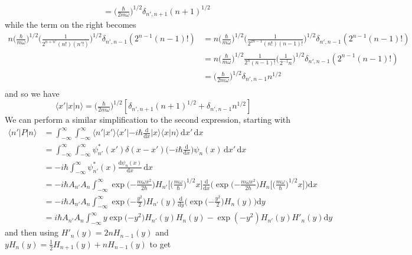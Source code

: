 \documentclass[../principles-of-quantum-mechanics.tex]{subfiles}
\begin{document}
\begin{questions}
\begin{solution}
\begin{align*}
				&= \big(\tfrac{\hbar}{2m\omega}\big)^{1/2}\delta_{n', n+1}(n+1)^{1/2}
			\end{align*}
			while the term on the right becomes
			\begin{align*}
				n\big(\tfrac{\hbar}{m\omega}\big)^{1/2}\big(\tfrac{1}{2^{n + n'}(n!)(n'!)}\big)^{1/2}\delta_{n', n-1}(2^{n-1}(n-1)!) &= n\big(\tfrac{\hbar}{m\omega}\big)^{1/2}\big(\tfrac{1}{2^{2n - 1}(n!)(n-1)!}\big)^{1/2}\delta_{n', n-1}(2^{n-1}(n-1)!) \\
				&= n\big(\tfrac{\hbar}{m\omega}\big)^{1/2}\tfrac{1}{2^n(n-1)!}\big(\tfrac{1}{2^{-1}n}\big)^{1/2}\delta_{n', n-1}(2^{n-1}(n-1)!) \\
				&= \big(\tfrac{\hbar}{2m\omega}\big)^{1/2}\delta_{n', n-1}n^{1/2} \\
			\end{align*}
			and so we have
			$$
			\langle x'|x|n\rangle = \big(\tfrac{\hbar}{2m\omega}\big)^{1/2}[\delta_{n', n+1}(n + 1)^{1/2} + \delta_{n', n -1}n^{1/2}]$$
			We can perform a similar simplification to the second expression, starting with
			\begin{align*}
				\langle n'|P|n\rangle &= \int_{-\infty}^{\infty}\int_{-\infty}^{\infty}\langle n'|x'\rangle\langle x'|{-i\hbar\frac{\mathrm{d}}{\mathrm{d}x}}|x\rangle\langle x|n\rangle\,\mathrm{d}x'\,\mathrm{d}x \\
				&= \int_{-\infty}^{\infty}\int_{-\infty}^{\infty}\psi_{n'}^*(x')\delta(x - x')\Big({-i\hbar\frac{\mathrm{d}}{\mathrm{d}x}}\Big)\psi_n(x)\,\mathrm{d}x'\,\mathrm{d}x \\
				&= -i\hbar\int_{-\infty}^{\infty}\psi_{n'}^*(x)\frac{\mathrm{d}\psi_n(x)}{\mathrm{d}x}\,\mathrm{d}x \\
				&= -i\hbar A_{n'}A_n\int_{-\infty}^{\infty}\exp\big({-\tfrac{m\omega x^2}{2\hbar}}\big)H_{n'}\big[\big(\tfrac{m\omega}{\hbar}\big)^{1/2}x\big]\frac{\mathrm{d}}{\mathrm{d}x}\Big(\exp\big({-\tfrac{m\omega x^2}{2\hbar}}\big)H_{n}\big[\big(\tfrac{m\omega}{\hbar}\big)^{1/2}x\big]\Big)\mathrm{d}x \\
				&= -i\hbar A_{n'}A_n\int_{-\infty}^{\infty}\exp\big({-\tfrac{y^2}{2}}\big)H_{n'}(y)\frac{\mathrm{d}}{\mathrm{d}y}\Big(\exp\big({-\tfrac{ y^2}{2}}\big)H_{n}(y)\Big)\mathrm{d}y \\
				&= i\hbar A_{n'}A_n\int_{-\infty}^{\infty}y\exp\big({-y^2}\big)H_{n'}(y)H_n(y) - \exp(-y^2)H_{n'}(y)H'_n(y)\mathrm{d}y
			\end{align*}
			and then using $H'_n(y) = 2nH_{n-1}(y)$ and $yH_n(y) = \tfrac{1}{2}H_{n+1}(y) + nH_{n-1}(y)$ to get
			\begin{align*}

\end{align*}
\end{solution}
\end{questions}
\end{document}
